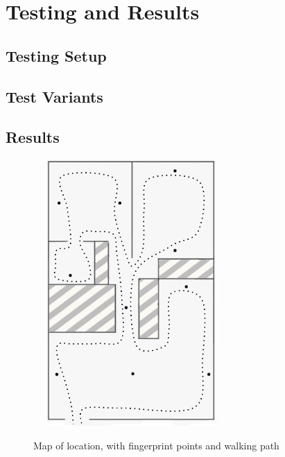 \chapter{Testing and Results}
\label{results}
%

\section{Testing Setup}
%

\section{Test Variants}
%

\section{Results}
%


\begin{figure}[htb] %
	\centering
	\ \includegraphics[width=2.8in,height=4in]{loc1_path.png}
	\caption{Map of location, with fingerprint points and walking path}
	\label{loc1_path}
\end{figure}


